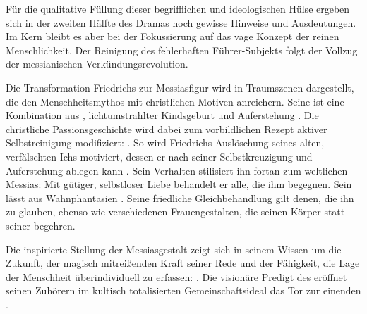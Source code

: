 Für die qualitative Füllung dieser begrifflichen und ideologischen Hülse
ergeben sich in der zweiten Hälfte des Dramas noch gewisse Hinweise und
Ausdeutungen. Im Kern bleibt es aber bei der Fokussierung auf das vage
Konzept der reinen Menschlichkeit. Der Reinigung des fehlerhaften
Führer-Subjekts folgt der Vollzug der messianischen Verkündungsrevolution.


Die Transformation Friedrichs zur Messiasfigur wird in Traumszenen dargestellt, die
den Menschheitsmythos mit christlichen Motiven anreichern. Seine
\Cite{Wiedergeburt} ist eine Kombination aus ,
lichtumstrahlter Kindsgeburt und Auferstehung .
Die christliche Passionsgeschichte wird dabei zum vorbildlichen Rezept
aktiver Selbstreinigung modifiziert: \Cite{Nicht Römer schlugen ihn ans Kreuz
  / Er kreuzigte sich selbst.}
.  So wird Friedrichs Auslöschung
seines alten, verfälschten Ichs motiviert, dessen \Cite{Schmach} er nach
seiner Selbstkreuzigung und Auferstehung \Cite{wie Dornenkronen}
ablegen kann .  Sein Verhalten stilisiert ihn fortan zum
weltlichen Messias: Mit gütiger, selbstloser Liebe behandelt er alle, die ihm
begegnen. Sein
\Cite{Mitleid} lässt \Cite{Kranke} aus Wahnphantasien \Cite{erwachen}
. Seine friedliche Gleichbehandlung gilt denen, die ihn zu
\Cite{hassen}  glauben, ebenso wie verschiedenen
Frauengestalten, die seinen Körper statt seiner
\Cite{Güte}  begehren.

Die inspirierte Stellung der Messiasgestalt zeigt sich in seinem Wissen um die
Zukunft, der magisch mitreißenden Kraft seiner Rede und der Fähigkeit, die
Lage der Menschheit überindividuell zu erfassen: \Cite{Ihr Brüder und
  Schwestern: Keinen von euch kenne ich und doch weiß ich um euch alle.}
. Die
visionäre Predigt des \Cite{Führer[s]} eröffnet seinen
Zuhörern im kultisch totalisierten Gemeinschaftsideal das Tor zur einenden
\Cite{Menschheitskathedrale} .\label{mkath}

